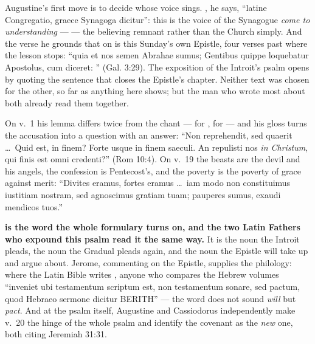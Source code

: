 \begin{witnessnote}
Augustine's first move is to decide whose voice sings. , he says,
``latine Congregatio, graece Synagoga dicitur'': this is the voice of the
Synagogue \textit{come to understanding} ---  --- the
believing remnant rather than the Church simply. And the verse he grounds that
on is this Sunday's own Epistle, four verses past where the lesson stops:
``quia et nos semen Abrahae sumus; Gentibus quippe loquebatur Apostolus, cum
diceret: ''
(Gal. 3:29). The exposition of the Introit's psalm opens by quoting the
sentence that closes the Epistle's chapter. Neither text was chosen for the
other, so far as anything here shows; but the man who wrote most about both
already read them together.

On v.~1 his lemma differs twice from the chant ---  for
,  for  --- and
his gloss turns the accusation into a question with an answer: ``Non
reprehendit, sed quaerit \dots\ Quid est, in finem? Forte usque in finem
saeculi. An repulisti nos \textit{in Christum}, qui finis est omni
credenti?'' (Rom 10:4). On v.~19 the beasts are the devil and his angels, the
confession is Pentecost's, and the poverty is the poverty of grace against
merit: ``Divites eramus, fortes eramus \dots\ iam modo non constituimus
iustitiam nostram, sed agnoscimus gratiam tuam; pauperes sumus, exaudi mendicos
tuos.''
\end{witnessnote}

\textbf{ is the word the whole formulary turns on, and the
two Latin Fathers who expound this psalm read it the same way.} It is the noun the Introit pleads,
the noun the Gradual pleads again, and the noun the Epistle will take up and
argue about. Jerome, commenting on the Epistle, supplies the philology: where
the Latin Bible writes , anyone who compares the Hebrew
volumes ``inveniet ubi testamentum scriptum est, non testamentum sonare, sed
pactum, quod Hebraeo sermone dicitur BERITH'' --- the word does not sound
\textit{will} but \textit{pact}. And at the psalm itself, Augustine and
Cassiodorus independently make v.~20 the hinge of the whole psalm and identify
the covenant as the \emph{new} one, both citing Jeremiah 31:31.

